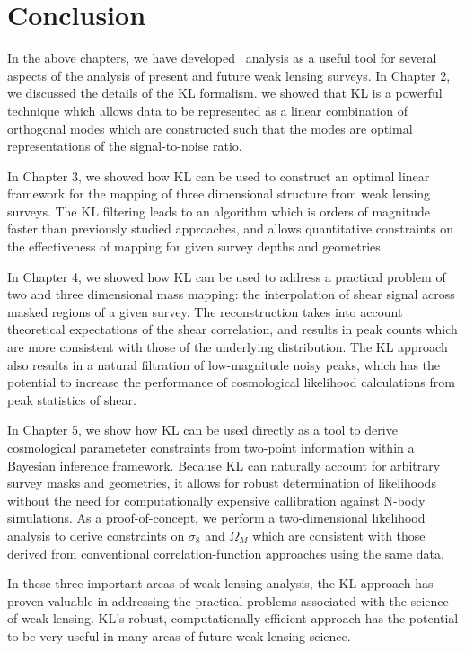 \chapter{Conclusion}
In the above chapters, we have developed \KL\ analysis as a useful tool
for several aspects of the analysis of present and future weak lensing
surveys.  In Chapter 2, we discussed the details of the KL formalism.
we showed that KL is a powerful technique which allows data to be represented
as a linear combination of orthogonal modes which are constructed such that
the modes are optimal representations of the signal-to-noise ratio.

In Chapter 3, we showed how KL can be used to construct an optimal linear
framework for the mapping of three dimensional structure from weak lensing
surveys.  The KL filtering leads to an algorithm which is orders of magnitude
faster than previously studied approaches, and allows quantitative constraints
on the effectiveness of mapping for given survey depths and geometries.

In Chapter 4, we showed how KL can be used to address a practical problem
of two and three dimensional mass mapping: the interpolation of shear signal
across masked regions of a given survey.  The reconstruction takes into
account theoretical expectations of the shear correlation, and results in
peak counts which are more consistent with those of the underlying
distribution.  The KL approach also results in a natural filtration of
low-magnitude noisy peaks, which has the potential to increase the
performance of cosmological likelihood calculations from peak statistics
of shear.

In Chapter 5, we show how KL can be used directly as a tool to derive
cosmological parameteter constraints from two-point information within
a Bayesian inference framework. Because KL can naturally account for 
arbitrary survey masks and geometries, it allows for robust determination
of likelihoods without the need for computationally expensive callibration
against N-body simulations.
As a proof-of-concept, we perform a
two-dimensional likelihood analysis to derive constraints on $\sigma_8$
and $\Omega_M$ which are consistent with those derived from conventional
correlation-function approaches using the same data.

In these three important areas of weak lensing analysis, the KL approach
has proven valuable in addressing the practical problems associated with
the science of weak lensing.  KL's robust, computationally efficient approach
has the potential to be very useful in many areas of future weak lensing
science.
